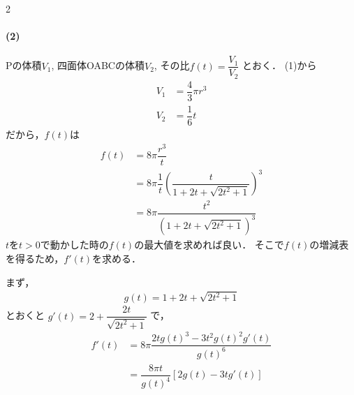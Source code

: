 \documentclass[../../main.tex]{subfiles}
\begin{document}
\begin{multicols}{2}
  \paragraph{(2)}
  Pの体積$V_1$, 四面体OABCの体積$V_2$, その比$f(t) = \dfrac{V_1}{V_2}$ とおく．
  (1)から
  \begin{align}
    V_1 & = \dfrac{4}{3} \pi r^3 \\
    V_2 & = \dfrac{1}{6} t
  \end{align}
  だから，$f(t)$は
  \begin{align}
    f(t) & = 8\pi \dfrac{r^3}{t}                                          \nonumber \\
    & = 8\pi \dfrac{1}{t}\left(\dfrac{t}{1+2t+\sqrt{2t^2+1}}\right)^3 \nonumber \\
    & = 8\pi \dfrac{t^2}{(1+2t+\sqrt{2t^2+1})^3} \label{eq:4}
  \end{align}
  $t$を$t>0$で動かした時の$f(t)$の最大値を求めれば良い．
  そこで$f(t)$の増減表を得るため，$f'(t)$を求める．

  まず，
  \begin{align}
    g(t) = 1+2t+\sqrt{2t^2+1}  \label{eq:5}
  \end{align}
  とおくと $g'(t) = 2 + \dfrac{2t}{\sqrt{2t^2+1}}$ で，
  \begin{align}
    f'(t) & = 8\pi \dfrac{2t g(t)^3 - 3t^2 g(t)^2 g'(t)}{g(t)^6}      \\
    & = \dfrac{8\pi t}{g(t)^4} \left[ 2 g(t) - 3t g'(t) \right]
  \end{align}


\end{multicols}
\end{document}

